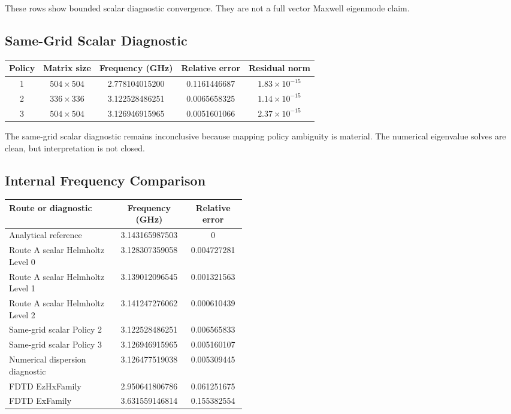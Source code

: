 \documentclass[11pt,a4paper]{article}
\begin{document}
These rows show bounded scalar diagnostic convergence. They are not a full vector Maxwell eigenmode claim.

\subsection{Same-Grid Scalar Diagnostic}

\begin{longtable}{ccccc}
\toprule
\textbf{Policy} & \textbf{Matrix size} & \textbf{Frequency (GHz)} & \textbf{Relative error} & \textbf{Residual norm}\\
\midrule
\endhead
1 & \(504\times 504\) & 2.778104015200 & 0.1161446687 & \(1.83\times 10^{-15}\)\\
2 & \(336\times 336\) & 3.122528486251 & 0.0065658325 & \(1.14\times 10^{-15}\)\\
3 & \(504\times 504\) & 3.126946915965 & 0.0051601066 & \(2.37\times 10^{-15}\)\\
\bottomrule
\end{longtable}

The same-grid scalar diagnostic remains inconclusive because mapping policy ambiguity is material. The numerical eigenvalue solves are clean, but interpretation is not closed.

\subsection{Internal Frequency Comparison}

\begin{longtable}{p{0.46\linewidth}cc}
\toprule
\textbf{Route or diagnostic} & \textbf{Frequency (GHz)} & \textbf{Relative error}\\
\midrule
\endhead
Analytical reference & 3.143165987503 & 0\\
Route A scalar Helmholtz Level 0 & 3.128307359058 & 0.004727281\\
Route A scalar Helmholtz Level 1 & 3.139012096545 & 0.001321563\\
Route A scalar Helmholtz Level 2 & 3.141247276062 & 0.000610439\\
Same-grid scalar Policy 2 & 3.122528486251 & 0.006565833\\
Same-grid scalar Policy 3 & 3.126946915965 & 0.005160107\\
Numerical dispersion diagnostic & 3.126477519038 & 0.005309445\\
FDTD EzHxFamily & 2.950641806786 & 0.061251675\\
FDTD ExFamily & 3.631559146814 & 0.155382554\\
\bottomrule
\end{longtable}
\end{document}
